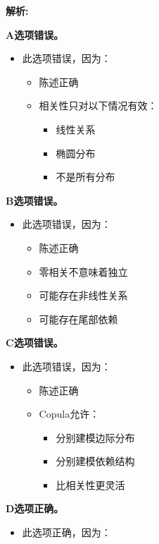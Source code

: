 \documentclass{article}
\newenvironment{explanation}
{\textbf{解析:}\par}
{\par}
\begin{document}
\begin{explanation}
    \textbf{A选项错误。}
    \begin{itemize}
        \item 此选项错误，因为：
        \begin{itemize}
            \item 陈述正确
            \item 相关性只对以下情况有效：
            \begin{itemize}
                \item 线性关系
                \item 椭圆分布
                \item 不是所有分布
            \end{itemize}
        \end{itemize}
    \end{itemize}
    \textbf{B选项错误。}
    \begin{itemize}
        \item 此选项错误，因为：
        \begin{itemize}
            \item 陈述正确
            \item 零相关不意味着独立
            \item 可能存在非线性关系
            \item 可能存在尾部依赖
        \end{itemize}
    \end{itemize}
    \textbf{C选项错误。}
    \begin{itemize}
        \item 此选项错误，因为：
        \begin{itemize}
            \item 陈述正确
            \item Copula允许：
            \begin{itemize}
                \item 分别建模边际分布
                \item 分别建模依赖结构
                \item 比相关性更灵活
            \end{itemize}
        \end{itemize}
    \end{itemize}
    \textbf{D选项正确。}
    \begin{itemize}
        \item 此选项正确，因为：
        \begin{itemize}

\end{itemize}
\end{itemize}
\end{explanation}
\end{document}
